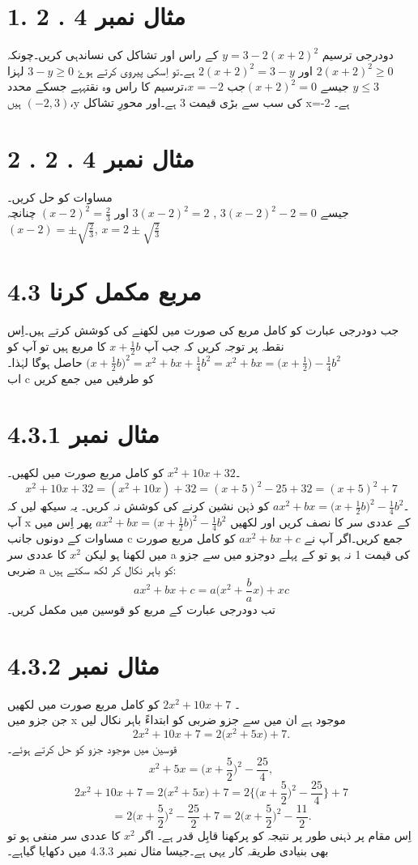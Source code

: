 \section{مثال نمبر               4 . 2 .1}
 دودرجی ترسیم  \(y=3-2(x+2)^{2}\)  کے راس اور تشاکل کی نساندہی کریں۔چونکہ  \(2(x+2)^{2}\ge 0\) اور  \(2(x+2)^{2}=3-y\) ہے۔تو اِسکی پیروی کرتے ہوۓ  \(3-y\ge 0\) لہزا \(y\le 3\) جیسے \((x+2)^{2}=0\)جب \(x=-2\)،ترسیم کا راس وہ نقتہہے جسکے محدد \((-2,3)\) ہیں،y کی سب سے بڑی قیمت 3 ہے۔اور محورِ تشاکل x=-2 ہے۔\\
\section{ مثال نمبر 4 . 2 . 2}
 مساوات کو حل کریں۔\\
 جیسے  \(3(x-2)^{2}-2=0\) , \(3(x-2)^{2}=2\) اور  \((x-2)^{2}=\frac{2}{3}\) چنانچہ \((x-2)=\pm \sqrt{\frac{2}{3}}\), \(x=2\pm \sqrt{\frac{2}{3}}\) \\ 
 \section{ 4.3 مربع مکمل کرنا} 
  جب دودرجی عبارت کو کامل مربع کی صورت میں لکھنے کی کوشش کرتے ہیں۔اِس نقطہ پر توجہ کریں کہ جب آپ  \(x+\frac{1}{2}b\) کا مربع ہیں تو آپ کو  \(\big(x+\frac{1}{2}b\big)^{2}=x^{2}+bx+\frac{1}{4}b^{2}=x^{2}+bx=\big(x+\frac{1}{2}\big)-\frac{1}{4}b^{2}\) حاصل ہوگا لہٰذا۔  \\اب c کو طرفیں میں جمع کریں                     
\section{ مثال نمبر  4.3.1}
        ۔\(x^{2}+10x+32\) کو کامل مربع صورت میں لکھیں۔ 
        \[x^{2}+10x+32=(x^{2}+10x)+32={(x+5)^{2}-25}+32=(x+5)^{2}+7\] 
        ۔\(ax^{2}+bx=\big(x+\frac{1}{2}b\big)^{2}-\frac{1}{4}b^{2}\)  کو ذہن نشین کرنے کی کوشش نہ کریں۔ یہ سیکھ لیں کہ آپ x کے عددی سر کا نصف کریں اور لکھیں  \(ax^{2}+bx=\big(x+\frac{1}{2}b\big)^{2}-\frac{1}{4}b^{2}\)  پھر اِس میں مساوات کے دونوں جانب c جمع کریں۔اگر آپ نے  \(ax^{2}+bx+c\) کو کامل مربع صورت میں لکھنا ہو لیکن \(x^{2}\) کا عددی سر a کی قیمت 1 نہ ہو تو کے پہلے دوجزو میں سے جزو ضربی a کو باہر نکال کر لکھ سکتے ہیں:
\[ax^{2}+bx+c=a\big(x^{2}+\frac{b}{a}x\big)+xc\] 
 تب دودرجی عبارت کے مربع کو قوسین میں مکمل کریں۔\\
 \newpage 
\section{مثال نمبر 4.3.2}
۔ \(2x^{2}+10x+7\) کو کامل مربع صورت میں لکھیں \\ جن جزو میں x موجود ہے ان میں سے جزو ضربی کو ابتداءً باہر نکال لیں\\
\[2x^{2}+10x+7=2\big(x^{2}+5x)+7.\]
 قوسین میں موجود جزو کو حل کرتے ہوئے۔\\
\[x^{2}+5x=\big(x+\frac{5}{2}\big)^{2}-\frac{25}{4},\]
\[2x^{2}+10x+7=2\big(x^{2}+5x\big)+7=2\big\{\big(x+\frac{5}{2}\big)^{2}-\frac{25}{4}\big\}+7\]
\[=2\big(x+\frac{5}{2}\big)^{2}-\frac{25}{2}+7=2\big(x+\frac{5}{2}\big)^{2}-\frac{11}{2}.\]
  اِس مقام پر ذہنی طور پر نتیجہ کو پرکھنا قابِل قدر ہے۔
 اگر  \(x^{2}\) کا عددی سر منفی ہو تو بھی بنیادی طریقہ کار یہی ہے۔جیسا مثال نمبر 4.3.3 میں دکھایا گیاہے۔
